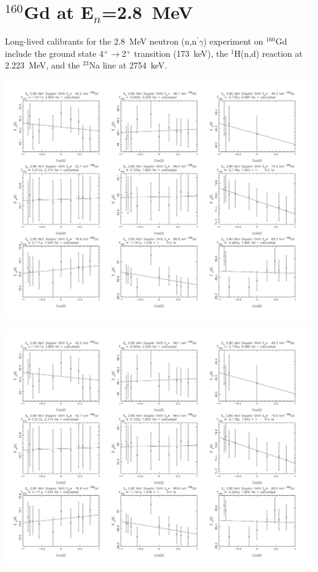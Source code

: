 \section{$^{160}$Gd at E$_n$=2.8~MeV}\label{app:DSAM_Gd_28}%
Long-lived calibrants for the 2.8~MeV neutron (n,n$^\prime\gamma$) experiment on $^{160}$Gd include the ground state 4$^+\rightarrow$2$^+$ transition (173~keV), the $^1$H(n,d) reaction at 2.223~MeV, and the $^{23}$Na line at 2754~keV.
\begin{center}
\includegraphics[page=1,angle=90,height=0.95\textheight]{160Gd_28ftau_LE_no.pdf}
\end{center}
\begin{center}
\includegraphics[page=2,angle=90,height=0.95\textheight]{160Gd_28ftau_LE_no.pdf}
\end{center}
